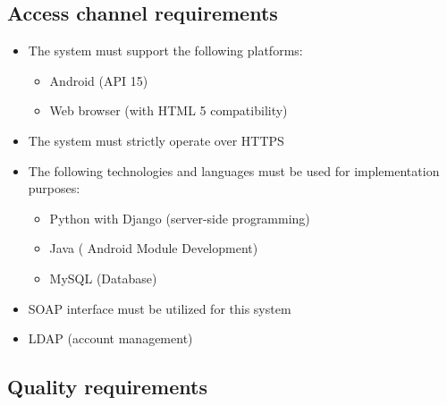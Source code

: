 \documentclass[12pt]{article}
\begin{document}
		\vspace{0.2in}
		
		\subsection{Access channel requirements}
		
			\vspace{0.2in}
			\begin{itemize}
						\item The system must support the following platforms: 
							\begin{itemize}
								\item Android (API 15)
								\item Web browser (with HTML 5 compatibility)
							\end{itemize}
							
						\item The system must strictly operate over HTTPS
						\item The following technologies and languages must be used for implementation purposes:
							\begin{itemize}
								\item Python with Django (server-side programming)
								\item Java ( Android Module Development)
								\item MySQL (Database)
							\end{itemize}
							\item SOAP interface must be utilized for this system
							\item LDAP (account management)
			\end{itemize}
			
		
		\subsection{Quality requirements}
		
\end{document}
